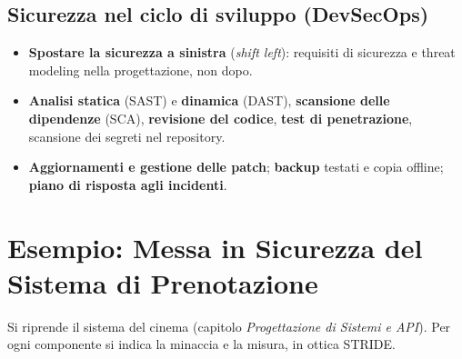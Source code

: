 \subsection{Sicurezza nel ciclo di sviluppo (DevSecOps)}
\begin{itemize}
    \item \textbf{Spostare la sicurezza a sinistra} (\emph{shift left}): requisiti di sicurezza e threat modeling nella progettazione, non dopo.
    \item \textbf{Analisi statica} (SAST) e \textbf{dinamica} (DAST), \textbf{scansione delle dipendenze} (SCA), \textbf{revisione del codice}, \textbf{test di penetrazione}, scansione dei segreti nel repository.
    \item \textbf{Aggiornamenti e gestione delle patch}; \textbf{backup} testati e copia offline; \textbf{piano di risposta agli incidenti}.
\end{itemize}

\section{Esempio: Messa in Sicurezza del Sistema di Prenotazione}
Si riprende il sistema del cinema (capitolo \emph{Progettazione di Sistemi e API}). Per ogni componente si indica la minaccia e la misura, in ottica STRIDE.

